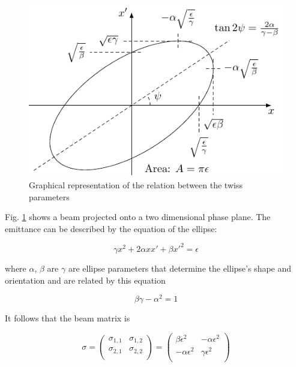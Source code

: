 \begin{figure}[!t]
	\centering
	\includegraphics{figures/ellipse}
	\caption{
		Graphical representation of the relation between the twiss parameters
		\cite{caldwell2015rkk}}
	\label{fig:ellipse}
\end{figure}

Fig. \ref{fig:ellipse} shows a beam projected onto a two dimensional phase
plane. The emittance can be described by the equation of the ellipse:

\begin{equation}
	\gamma x^2 + 2\alpha xx' + \beta x'^2 = \epsilon
\end{equation}

where \(\alpha\),  \(\beta\) are \(\gamma\) are ellipse parameters that
determine the ellipse's shape and orientation and are related by this equation

\begin{equation}
	\beta\gamma - \alpha^2 = 1
\end{equation}



It follows that the beam matrix is

\begin{equation}
	\sigma =
	\begin{pmatrix}
		\sigma_{1,1} & \sigma_{1,2} \\
		\sigma_{2,1} & \sigma_{2,2} \\
	\end{pmatrix}
	=
	\begin{pmatrix}
		\beta\epsilon^2 & -\alpha\epsilon^2 \\
		-\alpha\epsilon^2 & \gamma\epsilon^2 \\
	\end{pmatrix}
\end{equation}


